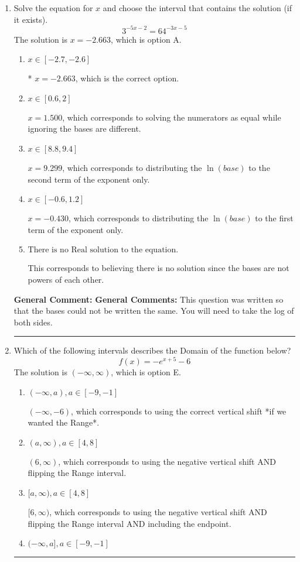 \documentclass{extbook}[14pt]
\newcommand{\litem}[1]{\item #1

\rule{\textwidth}{0.4pt}}
\begin{document}
\begin{enumerate}\litem{
Solve the equation for $x$ and choose the interval that contains the solution (if it exists).
\[ 3^{-5x-2} = 64^{-3x-5} \]
The solution is \( x = -2.663 \), which is option A.\begin{enumerate}[label=\Alph*.]
\item \( x \in [-2.7, -2.6] \)

* $x = -2.663$, which is the correct option.
\item \( x \in [0.6, 2] \)

$x = 1.500$, which corresponds to solving the numerators as equal while ignoring the bases are different.
\item \( x \in [8.8, 9.4] \)

$x = 9.299$, which corresponds to distributing the $\ln(base)$ to the second term of the exponent only.
\item \( x \in [-0.6, 1.2] \)

$x = -0.430$, which corresponds to distributing the $\ln(base)$ to the first term of the exponent only.
\item \( \text{There is no Real solution to the equation.} \)

This corresponds to believing there is no solution since the bases are not powers of each other.
\end{enumerate}

\textbf{General Comment:} \textbf{General Comments:} This question was written so that the bases could not be written the same. You will need to take the log of both sides.
}
\litem{
Which of the following intervals describes the Domain of the function below?
\[ f(x) = -e^{x+5}-6 \]
The solution is \( (-\infty, \infty) \), which is option E.\begin{enumerate}[label=\Alph*.]
\item \( (-\infty, a), a \in [-9, -1] \)

$(-\infty, -6)$, which corresponds to using the correct vertical shift *if we wanted the Range*.
\item \( (a, \infty), a \in [4, 8] \)

$(6, \infty)$, which corresponds to using the negative vertical shift AND flipping the Range interval.
\item \( [a, \infty), a \in [4, 8] \)

$[6, \infty)$, which corresponds to using the negative vertical shift AND flipping the Range interval AND including the endpoint.
\item \( (-\infty, a], a \in [-9, -1] \)


\end{enumerate}}
\end{enumerate}
\end{document}
